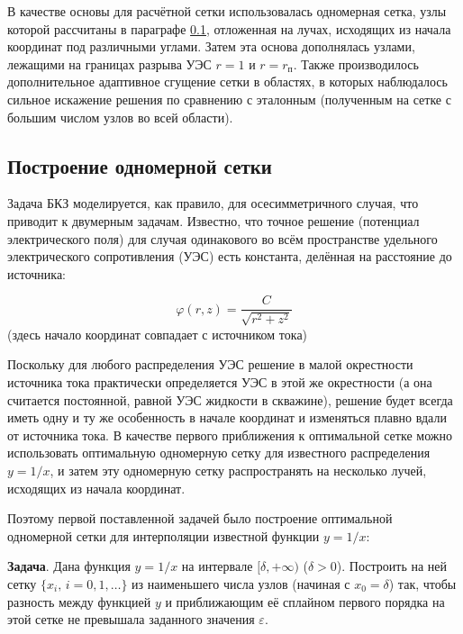В качестве основы для расчётной сетки использовалась одномерная сетка, узлы которой рассчитаны в параграфе
\ref{OneDim}, отложенная на лучах, исходящих из начала координат под различными углами.
Затем эта основа дополнялась узлами, лежащими на границах разрыва УЭС $r=1$ и $r=r_\text{п}$.
Также производилось дополнительное адаптивное сгущение сетки в областях, в которых наблюдалось сильное искажение
решения по сравнению с эталонным (полученным на сетке с большим числом узлов во всей области).

\subsection{Построение одномерной сетки}
\label{OneDim}

Задача БКЗ моделируется, как правило, для осесимметричного случая, что приводит к двумерным задачам.
Известно, что точное решение (потенциал электрического поля) для случая одинакового во всём пространстве
удельного электрического сопротивления (УЭС) есть константа, делённая на расстояние до источника:

$$\varphi(r, z)=\frac{C}{\sqrt{r^2+z^2}}$$ (здесь начало координат совпадает с источником тока)

Поскольку для любого распределения УЭС решение в малой окрестности источника тока практически определяется
УЭС в этой же окрестности (а она считается постоянной, равной УЭС жидкости в скважине), решение будет всегда
иметь одну и ту же особенность в начале координат и изменяться плавно вдали от источника тока.
В качестве первого приближения к оптимальной сетке можно использовать оптимальную одномерную сетку
для известного распределения $y=1/x$, и затем эту одномерную сетку распространять на несколько лучей,
исходящих из начала координат.

Поэтому первой поставленной задачей было построение оптимальной одномерной сетки для интерполяции
известной функции $y=1/x$:

{\bf Задача}. Дана функция $y=1/x$ на интервале $[\delta, +\infty)$ ($\delta > 0$). Построить на ней сетку
$\{x_i,\,i=0,1,\dots\}$ из наименьшего числа узлов (начиная с $x_0=\delta$) так, чтобы разность между
функцией $y$ и приближающим её сплайном первого порядка на этой сетке не превышала заданного значения
$\varepsilon$.

\def\ibreak{& \\ &}
\def\iline{& \\ \cline{1-2} &}

